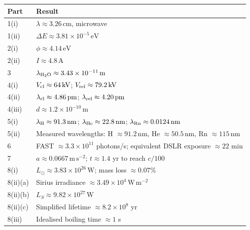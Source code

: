 \documentclass[11pt,a4paper]{article}
\begin{document}
\begin{center}
\small
\begin{tabular}{p{}p{}}
\toprule
\textbf{Part} & \textbf{Result}\\
\midrule
1(i) & $\lambda\approx3.26\,\mathrm{cm}$, microwave\\
1(ii) & $\Delta E\approx3.81\times10^{-5}\,\mathrm{eV}$\\
2(i) & $\phi\approx4.14\,\mathrm{eV}$\\
2(ii) & $I\approx4.8\,\mathrm A$\\
3 & $\lambda_{\rm H_2O}\approx3.43\times10^{-11}\,\mathrm m$\\
4(i) & $V_{\rm cl}\approx64\,\mathrm{kV}$; $V_{\rm rel}\approx79.2\,\mathrm{kV}$\\
4(ii) & $\lambda_{\rm cl}\approx4.86\,\mathrm{pm}$; $\lambda_{\rm rel}\approx4.20\,\mathrm{pm}$\\
4(iii) & $d\approx1.2\times10^{-10}\,\mathrm m$\\
5(i) & $\lambda_{\rm H}\approx91.3\,\mathrm{nm}$; $\lambda_{\rm He}\approx22.8\,\mathrm{nm}$; $\lambda_{\rm Rn}\approx0.0124\,\mathrm{nm}$\\
5(ii) & Measured wavelengths: H $\approx91.2\,\mathrm{nm}$, He $\approx50.5\,\mathrm{nm}$, Rn $\approx115\,\mathrm{nm}$\\
6 & FAST $\approx3.3\times10^{11}$ photons/s; equivalent DSLR exposure $\approx22$ min\\
7 & $a\approx0.0667\,\mathrm{m\,s^{-2}}$; $t\approx1.4$ yr to reach $c/100$\\
8(i) & $L_\odot\approx3.83\times10^{26}\,\mathrm W$; mass loss $\approx0.07\%$\\
8(ii)(a) & Sirius irradiance $\approx3.49\times10^4\,\mathrm{W\,m^{-2}}$\\
8(ii)(b) & $L_S\approx9.82\times10^{27}\,\mathrm W$\\
8(ii)(c) & Simplified lifetime $\approx8.2\times10^8$ yr\\
8(iii) & Idealised boiling time $\approx1$ s\\
\bottomrule
\end{tabular}
\end{center}
\end{document}
